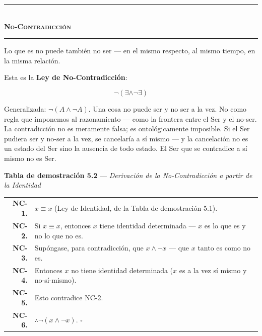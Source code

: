 \documentclass[10pt, openany, oneside]{book}
\renewcommand{\normalsize}{\fontsize{10}{13}\selectfont}
\renewcommand{\footnotesize}{\fontsize{8.5}{11}\selectfont}
\begin{document}

\begin{center}
    \rule{0.3\textwidth}{0.4pt}\\[0.5em]
    {\normalsize\bfseries\scshape No-Contradicción}\\[0.3em]
    \rule{0.3\textwidth}{0.4pt}
\end{center}

\vspace{1em}

\noindent Lo que es no puede también no ser --- en el mismo respecto, al mismo tiempo, en la misma relación.

Esta es la \textbf{Ley de No-Contradicción}:

$$\neg(\exists \wedge \neg\exists)$$

Generalizada: $\neg(A \wedge \neg A)$. Una cosa no puede ser y no ser a la vez. No como regla que imponemos al razonamiento --- como la frontera entre el Ser y el no-ser. La contradicción no es meramente falsa; es ontológicamente imposible. Si el Ser pudiera ser y no-ser a la vez, se cancelaría a sí mismo --- y la cancelación no es un estado del Ser sino la ausencia de todo estado. El Ser que se contradice a sí mismo no es Ser.

\vspace{0.5em}

\textbf{Tabla de demostración 5.2} --- \textit{Derivación de la No-Contradicción a partir de la Identidad}

\vspace{0.5em}

{\footnotesize
\noindent\begin{tabular}{r p{}}
\textbf{NC-1.} & $x \equiv x$ (Ley de Identidad, de la Tabla de demostración 5.1). \\[0.3em]
\textbf{NC-2.} & Si $x \equiv x$, entonces $x$ tiene identidad determinada --- $x$ es lo que es y no lo que no es. \\[0.3em]
\textbf{NC-3.} & Supóngase, para contradicción, que $x \wedge \neg x$ --- que $x$ tanto es como no es. \\[0.3em]
\textbf{NC-4.} & Entonces $x$ no tiene identidad determinada ($x$ es a la vez sí mismo y no-sí-mismo). \\[0.3em]
\textbf{NC-5.} & Esto contradice NC-2. \\[0.3em]
\textbf{NC-6.} & $\therefore \neg(x \wedge \neg x)$. $\square$ \\[0.3em]
\end{tabular}
}
\end{document}
